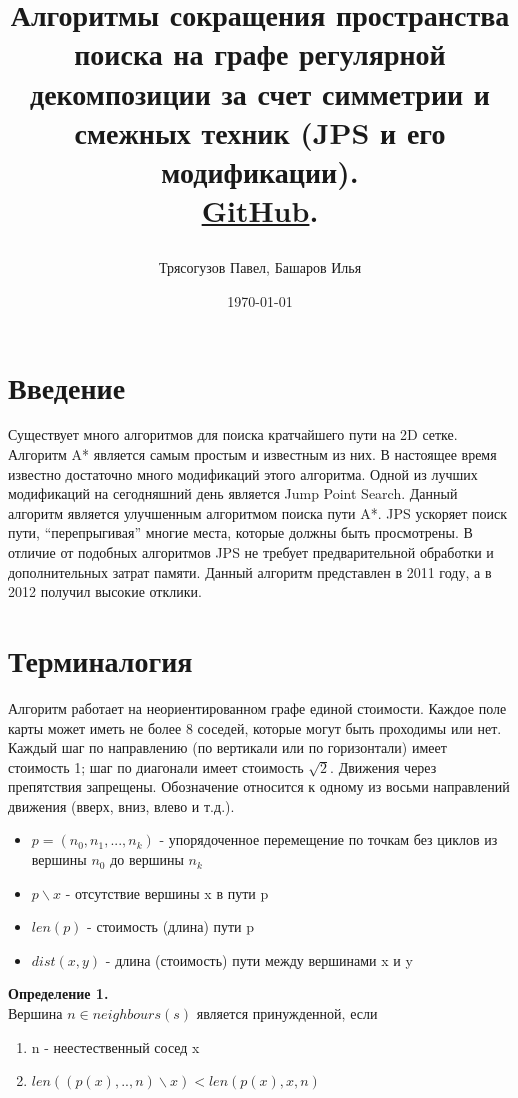 \documentclass{physlab}
\begin{document}
	
	\title{	Алгоритмы сокращения пространства поиска на графе регулярной декомпозиции за счет симметрии и смежных техник (JPS и его модификации). \\
	
	\href{https://github.com/Ilyabasharov/path_planning}{GitHub}.
	
}
	\author{Трясогузов Павел, Башаров Илья}
	\date{\today}
	
	\maketitle

\tableofcontents %


\section{Введение}
Существует много алгоритмов для поиска кратчайшего пути на 2D сетке. Алгоритм A* является самым простым и известным из них. В настоящее время известно достаточно много модификаций этого алгоритма. Одной из лучших модификаций на сегодняшний день является Jump Point Search. Данный алгоритм является улучшенным алгоритмом поиска пути A*. JPS ускоряет поиск пути, “перепрыгивая” многие места, которые должны быть просмотрены.  В отличие от подобных алгоритмов JPS не требует предварительной обработки и дополнительных затрат памяти. Данный алгоритм представлен в 2011 году, а в 2012 получил высокие отклики. \\


\section{Терминалогия}
Алгоритм работает на неориентированном графе единой стоимости. Каждое поле карты может иметь не более 8 соседей, которые могут быть проходимы или нет. Каждый шаг по направлению (по вертикали или по горизонтали) имеет стоимость 1; шаг по диагонали имеет стоимость $\sqrt{2}$. Движения через препятствия запрещены. Обозначение  относится к одному из восьми направлений движения (вверх, вниз, влево и т.д.). 
\begin{itemize}
    \item $p = (n_{0}, n_{1},...,n_{k})$ - упорядоченное перемещение по точкам без циклов из вершины $n_{0}$ до вершины $n_{k}$
    \item $p\backslash x$ - отсутствие вершины x в пути p
    \item $len(p)$ - стоимость (длина) пути p
    \item $dist(x, y)$ - длина (стоимость) пути между вершинами x и y

\end{itemize}
\textbf{Определение 1.} \\
Вершина $n \in neighbours(s)$ является принужденной, если 
\begin{enumerate}
    \item n - неестественный сосед x
    \item $len((p(x),..,n) \backslash x) < len(p(x), x, n)$
\end{enumerate}
\end{document}
